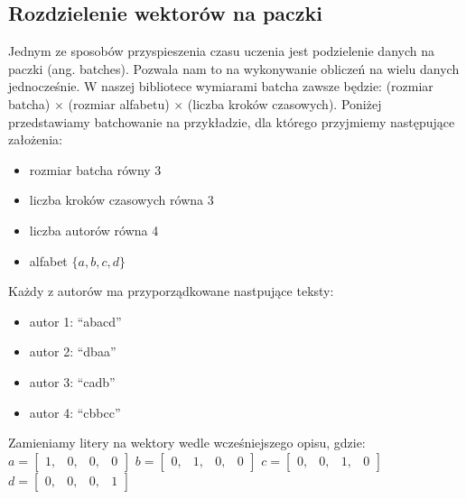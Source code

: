 \subsection{Rozdzielenie wektorów na paczki}
Jednym ze sposobów przyspieszenia czasu uczenia jest podzielenie danych na paczki (ang. batches).
Pozwala nam to na wykonywanie obliczeń na wielu danych jednocześnie. W naszej bibliotece 
wymiarami batcha zawsze będzie: (rozmiar batcha) $\times$ (rozmiar alfabetu) $\times$ (liczba kroków czasowych). 
Poniżej przedstawiamy batchowanie na przykładzie, dla którego przyjmiemy następujące założenia: 
\begin{itemize}
	\item rozmiar batcha równy 3
	\item liczba kroków czasowych równa 3
	\item liczba autorów równa 4
	\item alfabet $\{a,b,c,d\}$
\end{itemize}

Każdy z autorów ma przyporządkowane nastpujące teksty:
\begin{itemize}
	\item autor 1: ``abacd''
	\item autor 2: ``dbaa''
	\item autor 3: ``cadb''
	\item autor 4: ``cbbcc''
\end{itemize}

Zamieniamy litery na wektory wedle wcześniejszego opisu, gdzie:
\vspace{3mm}
\newline 
$
a =
\begin{bmatrix} 
1, & 0, & 0, & 0
\end{bmatrix} 
$
\vspace{3mm}
\newline
$
b = 
\begin{bmatrix} 
0, & 1, & 0, & 0
\end{bmatrix} 
$
\vspace{3mm}
\newline 
$
c =
\begin{bmatrix} 
0, & 0, & 1, & 0
\end{bmatrix} 
$
\vspace{3mm}
\newline 
$
d =
\begin{bmatrix} 
0, & 0, & 0, & 1
\end{bmatrix} 
$
\vspace{1mm}
\newline 

